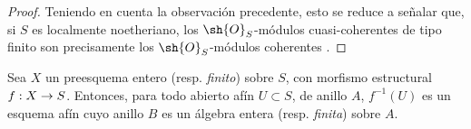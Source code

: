 \documentclass[oneside,10pt]{amsart}
\makeatletter
\newcommand{\ega@arrow}[2]{\mathchoice{#1}{#2}{#2}{#2}}
\renewcommand{\to}{\ega@arrow{\longrightarrow}{\rightarrow}}
\let\EGAOriginalLabel\label
\renewcommand{\label}[1]{\phantomsection\EGAOriginalLabel{#1}}
\makeatother
\begin{document}
\begin{proof}
Teniendo en cuenta la observación precedente, esto se reduce a señalar que, si $S$ es localmente noetheriano, los $\sh{O}_S$-módulos cuasi-coherentes de tipo finito son precisamente los $\sh{O}_S$-módulos coherentes .
\end{proof}

\begin{proposition}[6.1.4]
\label{II.6.1.4}
Sea $X$ un preesquema entero \textup{(resp. \emph{finito})} sobre $S$, con morfismo estructural $f:X\to S$.
Entonces, para todo abierto afín $U\subset S$, de anillo $A$, $f^{-1}(U)$ es un esquema afín cuyo anillo $B$ es un álgebra entera \textup{(resp. \emph{finita})} sobre $A$.
\end{proposition}
\end{document}
